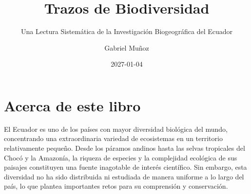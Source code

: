 \documentclass[
  letterpaper,
  DIV=11,
  numbers=noendperiod,
  oneside]{scrreprt}
\title{Trazos de Biodiversidad}
\subtitle{Una Lectura Sistemática de la Investigación Biogeográfica del
Ecuador}
\author{Gabriel Muñoz}
\date{2027-01-04}
\renewcommand*\contentsname{Table of contents}
\newcommand\contentsname{Table of contents}
\begin{document}
\maketitle

\renewcommand*\contentsname{Table of contents}
{
\hypersetup{linkcolor=}
\setcounter{tocdepth}{2}
\tableofcontents
}


\chapter*{Acerca de este libro}\label{acerca-de-este-libro}


El Ecuador es uno de los países con mayor diversidad biológica del
mundo, concentrando una extraordinaria variedad de ecosistemas en un
territorio relativamente pequeño. Desde los páramos andinos hasta las
selvas tropicales del Chocó y la Amazonía, la riqueza de especies y la
complejidad ecológica de sus paisajes constituyen una fuente inagotable
de interés científico. Sin embargo, esta diversidad no ha sido
distribuida ni estudiada de manera uniforme a lo largo del país, lo que
plantea importantes retos para su comprensión y conservación.
\end{document}
